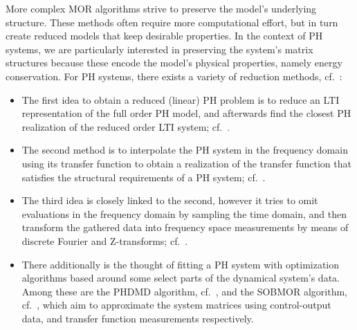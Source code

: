 More complex MOR algorithms strive to preserve the model's underlying structure.
These methods often require more computational effort, but in turn create reduced models that keep desirable properties.
In the context of \ac{PH} systems, we are particularly interested in preserving the system's matrix structures because these encode the model's physical properties, namely energy conservation.
For \ac{PH} systems, there exists a variety of reduction methods, cf.~\cite{Polyuga2010}:
\begin{itemize}
    \item The first idea to obtain a reduced (linear) \ac{PH} problem is to reduce an \ac{LTI} representation of the full order \ac{PH} model, and afterwards find the closest \ac{PH} realization of the reduced order \ac{LTI} system; cf.~\cite{Gillis2018, Cherifi2019}.
    \item The second method is to interpolate the \ac{PH} system in the frequency domain using its transfer function to obtain a realization of the transfer function that satisfies the structural requirements of a \ac{PH} system; cf.~\cite{BGD2020, Schwerdtner2021, Poussot2022}.
    \item The third idea is closely linked to the second, however it tries to omit evaluations in the frequency domain by sampling the time domain, and then transform the gathered data into frequency space measurements by means of discrete Fourier and Z-transforms; cf.~\cite{Najnudel2021, Cherifi2022, Günther2023}.
    \item There additionally is the thought of fitting a \ac{PH} system with optimization algorithms based around some select parts of the dynamical system's data.
        Among these are the \ac{PHDMD} algorithm, cf.~\cite{Morandin2023}, and the SOBMOR algorithm, cf.~\cite{SV2023}, which aim to approximate the system matrices using control-output data, and transfer function measurements respectively.
\end{itemize}


